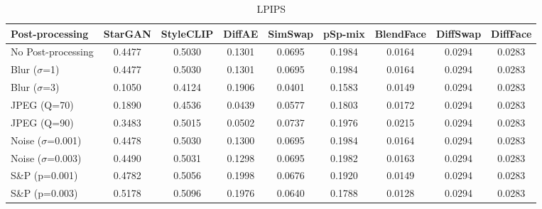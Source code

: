 \documentclass{article}
\begin{document}
\begin{table}[h!]
\begin{subtable}{\textwidth}
\caption{LPIPS}
\centering
\scriptsize
\begin{tabular}{lcccccccc}
\toprule
\textbf{Post-processing} & StarGAN & StyleCLIP & DiffAE & SimSwap & pSp-mix & BlendFace & DiffSwap & DiffFace \\
\midrule
No Post-processing & 0.4477 & 0.5030 & 0.1301 & 0.0695 & 0.1984 & 0.0164 & 0.0294 & 0.0283 \\
\midrule
Blur ($\sigma$=1) & 0.4477 & 0.5030 & 0.1301 & 0.0695 & 0.1984 & 0.0164 & 0.0294 & 0.0283 \\
Blur ($\sigma$=3) & 0.1050 & 0.4124 & 0.1906 & 0.0401 & 0.1583 & 0.0149 & 0.0294 & 0.0283 \\
JPEG (Q=70) & 0.1890 & 0.4536 & 0.0439 & 0.0577 & 0.1803 & 0.0172 & 0.0294 & 0.0283 \\
JPEG (Q=90) & 0.3483 & 0.5015 & 0.0502 & 0.0737 & 0.1976 & 0.0215 & 0.0294 & 0.0283 \\
Noise ($\sigma$=0.001) & 0.4478 & 0.5030 & 0.1300 & 0.0695 & 0.1984 & 0.0164 & 0.0294 & 0.0283 \\
Noise ($\sigma$=0.003) & 0.4490 & 0.5031 & 0.1298 & 0.0695 & 0.1982 & 0.0163 & 0.0294 & 0.0283 \\
S\&P (p=0.001) & 0.4782 & 0.5056 & 0.1998 & 0.0676 & 0.1920 & 0.0149 & 0.0294 & 0.0283 \\
S\&P (p=0.003) & 0.5178 & 0.5096 & 0.1976 & 0.0640 & 0.1788 & 0.0128 & 0.0294 & 0.0283 \\
\bottomrule
\end{tabular}
\end{subtable}


\end{table}
\end{document}
